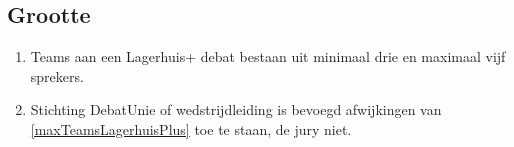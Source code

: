 \subsection{Grootte}

\begin{enumerate}
\item \label{maxTeamsLagerhuisPlus} Teams aan een Lagerhuis+ debat bestaan uit minimaal drie en maximaal vijf sprekers.
\item Stichting DebatUnie of wedstrijdleiding is bevoegd afwijkingen van \ref{maxTeamsLagerhuisPlus} toe te staan, de jury niet.
\end{enumerate}

